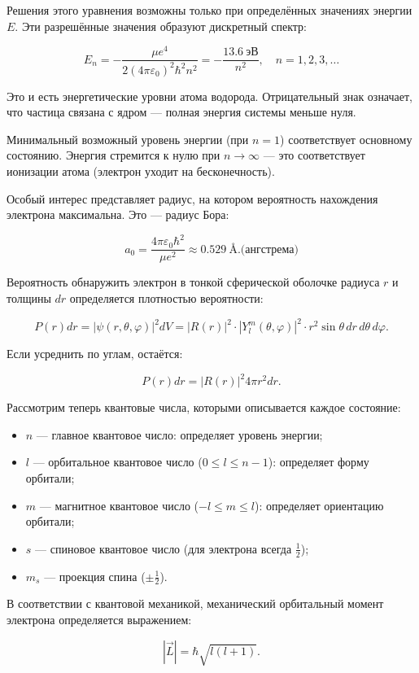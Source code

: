 \documentclass[12pt]{article}
\begin{document}
Решения этого уравнения возможны только при определённых значениях энергии $E$. Эти разрешённые значения образуют дискретный спектр:

$$
E_n = -\frac{\mu e^4}{2 (4\pi \varepsilon_0)^2 \hbar^2 n^2} = -\frac{13.6~\text{эВ}}{n^2}, \quad n = 1, 2, 3, \dots
$$

Это и есть энергетические уровни атома водорода. Отрицательный знак означает, что частица связана с ядром — полная энергия системы меньше нуля.

Минимальный возможный уровень энергии (при $n = 1$) соответствует основному состоянию. Энергия стремится к нулю при $n \to \infty$ — это соответствует ионизации атома (электрон уходит на бесконечность).

Особый интерес представляет радиус, на котором вероятность нахождения электрона максимальна. Это — радиус Бора:

$$
a_0 = \frac{4 \pi \varepsilon_0 \hbar^2}{\mu e^2} \approx 0.529~\text{\AA}. \text{(ангстрема)}
$$

Вероятность обнаружить электрон в тонкой сферической оболочке радиуса $r$ и толщины $dr$ определяется плотностью вероятности:

$$
P(r)dr = |\psi(r,\theta,\varphi)|^2 dV = |R(r)|^2 \cdot |Y_l^m(\theta, \varphi)|^2 \cdot r^2 \sin \theta \, dr \, d\theta \, d\varphi.
$$

Если усреднить по углам, остаётся:

$$
P(r) dr = |R(r)|^2 4\pi r^2 dr.
$$

Рассмотрим теперь квантовые числа, которыми описывается каждое состояние:

\begin{itemize}
    \item $n$ — главное квантовое число: определяет уровень энергии;
    \item $l$ — орбитальное квантовое число ($0 \le l \le n - 1$): определяет форму орбитали;
    \item $m$ — магнитное квантовое число ($-l \le m \le l$): определяет ориентацию орбитали;
    \item $s$ — спиновое квантовое число (для электрона всегда $\frac{1}{2}$);
    \item $m_s$ — проекция спина ($\pm\frac{1}{2}$).
\end{itemize}

В соответствии с квантовой механикой, механический орбитальный момент электрона определяется выражением:

$$
|\vec{L}| = \hbar \sqrt{l(l+1)}.
$$
\end{document}
